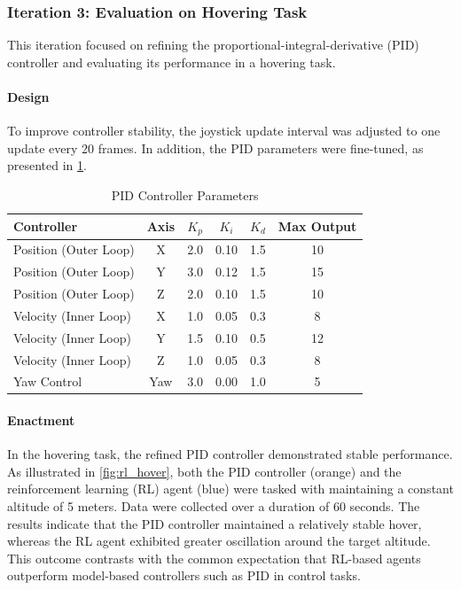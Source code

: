 \subsubsection{Iteration 3: Evaluation on Hovering Task}

This iteration focused on refining the proportional-integral-derivative (PID) controller and evaluating its performance in a hovering task.

\paragraph{Design}

To improve controller stability, the joystick update interval was adjusted to one update every 20 frames. In addition, the PID parameters were fine-tuned, as presented in \cref{table:pid_params}.

\begin{table}[h]
\centering
\caption{PID Controller Parameters} \label{table:pid_params}
\begin{tabular}{lccccc}
\hline
\textbf{Controller} & \textbf{Axis} & $K_p$ & $K_i$ & $K_d$ & Max Output \\
\hline
Position (Outer Loop) & X & 2.0 & 0.10 & 1.5 & 10 \\
Position (Outer Loop) & Y & 3.0 & 0.12 & 1.5 & 15 \\
Position (Outer Loop) & Z & 2.0 & 0.10 & 1.5 & 10 \\
\hline
Velocity (Inner Loop) & X & 1.0 & 0.05 & 0.3 & 8 \\
Velocity (Inner Loop) & Y & 1.5 & 0.10 & 0.5 & 12 \\
Velocity (Inner Loop) & Z & 1.0 & 0.05 & 0.3 & 8 \\
\hline
Yaw Control & Yaw & 3.0 & 0.00 & 1.0 & 5 \\
\hline
\end{tabular}
\end{table}

\paragraph{Enactment}

In the hovering task, the refined PID controller demonstrated stable performance. As illustrated in \cref{fig:rl_hover}, both the PID controller (orange) and the reinforcement learning (RL) agent (blue) were tasked with maintaining a constant altitude of 5 meters. Data were collected over a duration of 60 seconds. The results indicate that the PID controller maintained a relatively stable hover, whereas the RL agent exhibited greater oscillation around the target altitude. This outcome contrasts with the common expectation that RL-based agents outperform model-based controllers such as PID in control tasks.

